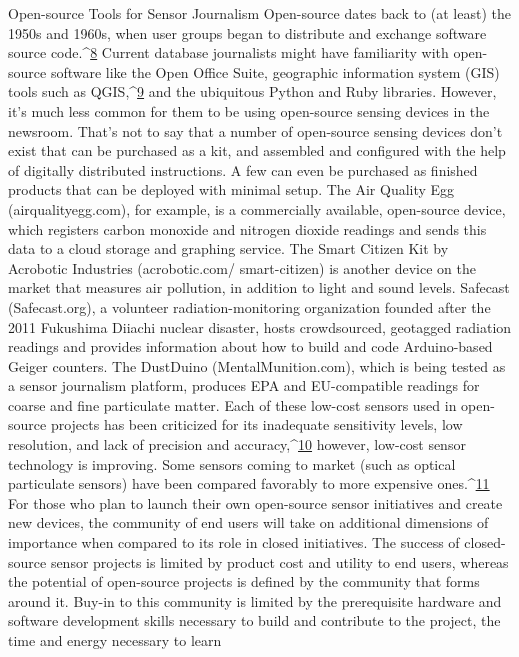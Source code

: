 Open-source Tools for Sensor Journalism
Open-source dates back to (at least) the 1950s and 1960s, when user groups
began to distribute and exchange software source code.^{\href{#endnotes-schroyer}{8}} Current database
journalists might have familiarity with open-source software like the Open
Office Suite, geographic information system (GIS) tools such as QGIS,^{\href{#endnotes-schroyer}{9}} and
the ubiquitous Python and Ruby libraries. However, it's much less common
for them to be using open-source sensing devices in the newsroom. That's
not to say that a number of open-source sensing devices don't exist that can
be purchased as a kit, and assembled and configured with the help of digitally
distributed instructions. A few can even be purchased as finished
products that can be deployed with minimal setup.
The Air Quality Egg (airqualityegg.com), for example, is a commercially
available, open-source device, which registers carbon monoxide and nitrogen
dioxide readings and sends this data to a cloud storage and graphing
service. The Smart Citizen Kit by Acrobotic Industries (acrobotic.com/
smart-citizen) is another device on the market that measures air pollution,
in addition to light and sound levels. Safecast (Safecast.org), a volunteer
radiation-monitoring organization founded after the 2011 Fukushima Diiachi
nuclear disaster, hosts crowdsourced, geotagged radiation readings and
provides information about how to build and code Arduino-based Geiger
counters. The DustDuino (MentalMunition.com), which is being tested as a
sensor journalism platform, produces EPA and EU-compatible readings for
coarse and fine particulate matter. Each of these low-cost sensors used in
open-source projects has been criticized for its inadequate sensitivity levels,
low resolution, and lack of precision and accuracy,^{\href{#endnotes-schroyer}{10}} however, low-cost sensor technology is improving. Some sensors coming to market (such as
optical particulate sensors) have been compared favorably to more
expensive ones.^{\href{#endnotes-schroyer}{11}}
For those who plan to launch their own open-source sensor initiatives and
create new devices, the community of end users will take on additional
dimensions of importance when compared to its role in closed initiatives.
The success of closed-source sensor projects is limited by product cost and
utility to end users, whereas the potential of open-source projects is defined
by the community that forms around it. Buy-in to this community is limited
by the prerequisite hardware and software development skills necessary to
build and contribute to the project, the time and energy necessary to learn
